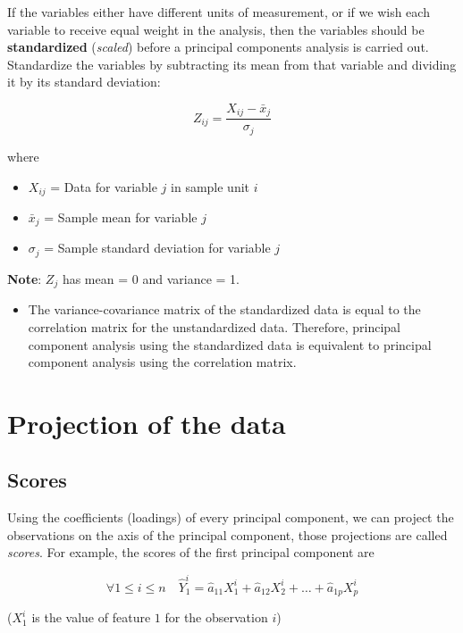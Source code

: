 \documentclass[]{book}
\providecommand{\tightlist}{%
  \setlength{\itemsep}{0pt}\setlength{\parskip}{0pt}}
\newenvironment{rmdblock}[1]
  {\begin{shaded*}
  \begin{itemize}
  \renewcommand{\labelitemi}{
    \raisebox{-.7\height}[0pt][0pt]{
      {\setkeys{Gin}{width=2em,keepaspectratio}\texttt{[image: img/icons/\#1]}}
    }
  }
  \item
  }
  {
  \end{itemize}
  \end{shaded*}
  }
\newenvironment{rmdinsight}
  {\begin{rmdblock}{insight}}
  {\end{rmdblock}}
\begin{document}
If the variables either have different units of measurement, or if we
wish each variable to receive equal weight in the analysis, then the
variables should be \textbf{standardized} (\emph{scaled}) before a
principal components analysis is carried out. Standardize the variables
by subtracting its mean from that variable and dividing it by its
standard deviation:

\[Z_{ij} = \frac{X_{ij}-\bar{x}_j}{\sigma_j}\]

where

\begin{itemize}
\tightlist
\item
  \(X_{ij}\) = Data for variable \(j\) in sample unit \(i\)
\item
  \(\bar{x}_j\) = Sample mean for variable \(j\)
\item
  \(\sigma_j\) = Sample standard deviation for variable \(j\)
\end{itemize}

\textbf{Note}: \(Z_j\) has mean = 0 and variance = 1.

\begin{rmdinsight}
The variance-covariance matrix of the standardized data is equal to the
correlation matrix for the unstandardized data. Therefore, principal
component analysis using the standardized data is equivalent to
principal component analysis using the correlation matrix.
\end{rmdinsight}

\section{Projection of the data}\label{projection-of-the-data}

\subsection*{Scores}\label{scores}

Using the coefficients (loadings) of every principal component, we can
project the observations on the axis of the principal component, those
projections are called \emph{scores}. For example, the scores of the
first principal component are

\[  \forall 1 \le i \le n \quad \hat{Y}_1^i  =  \hat{a}_{11}X_1^i + \hat{a}_{12}X_2^i + \dots + \hat{a}_{1p}X_p^i \]

(\(X_1^i\) is the value of feature \(1\) for the observation \(i\))
\end{document}

